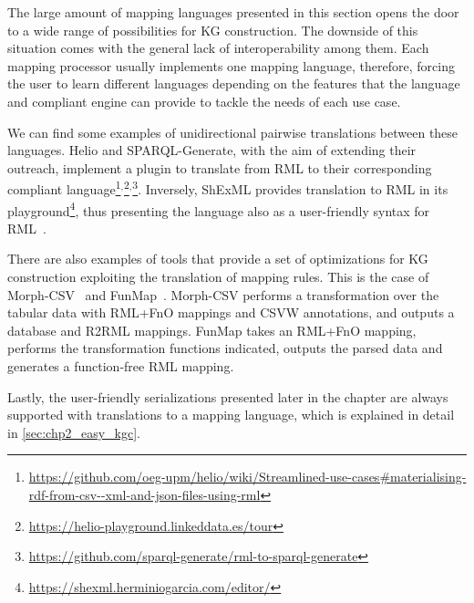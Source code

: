 The large amount of mapping languages presented in this section opens the door to a wide range of possibilities for KG construction. The downside of this situation comes with the general lack of interoperability among them. Each mapping processor usually implements one mapping language, therefore, forcing the user to learn different languages depending on the features that the language and compliant engine can provide to tackle the needs of each use case. 

We can find some examples of unidirectional pairwise translations between these languages. 
Helio and SPARQL-Generate, with the aim of extending their outreach, implement a plugin to translate from RML to their corresponding compliant language\footnote{\url{https://github.com/oeg-upm/helio/wiki/Streamlined-use-cases\#materialising-rdf-from-csv--xml-and-json-files-using-rml}}$^,$\footnote{\url{https://helio-playground.linkeddata.es/tour}}$^,$\footnote{\url{https://github.com/sparql-generate/rml-to-sparql-generate}}. Inversely, ShExML provides translation to RML in its playground\footnote{\url{https://shexml.herminiogarcia.com/editor/}}, thus presenting the language also as a user-friendly syntax for RML~\parencite{Garcia-Gonzalez2020shexml}. 

There are also examples of tools that provide a set of optimizations for KG construction exploiting the translation of mapping rules. This is the case of Morph-CSV~\parencite{chaves2021morph-csv} and FunMap~\parencite{jozashoori2020funmap}. Morph-CSV performs a transformation over the tabular data with RML+FnO mappings and CSVW annotations, and outputs a database and R2RML mappings. FunMap takes an RML+FnO mapping, performs the transformation functions indicated, outputs the parsed data and generates a function-free RML mapping.

Lastly, the user-friendly serializations presented later in the chapter are always supported with translations to a mapping language, which is explained in detail in \cref{sec:chp2_easy_kgc}.



